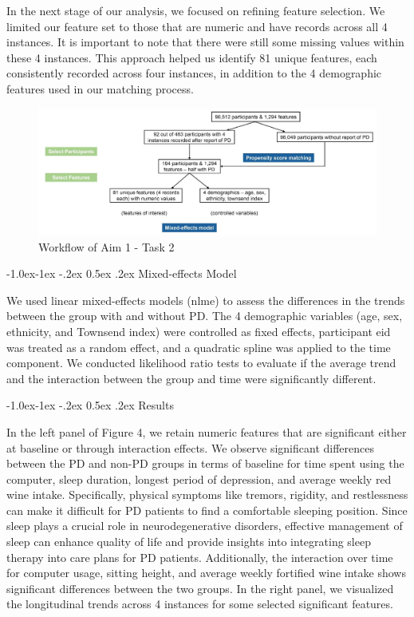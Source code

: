 \documentclass[12pt,]{article}
\makeatletter
\renewcommand\subsubsection{
  \@startsection{subsubsection}{3}{\z@}
    {-1.0ex\@plus -1ex \@minus -.2ex}%
    {0.5ex \@plus .2ex}%
    {\normalfont\normalsize\bf}} %
\makeatother
\begin{document}
In the next stage of our analysis, we focused on refining feature
selection. We limited our feature set to those that are numeric and have
records across all 4 instances. It is important to note that there were
still some missing values within these 4 instances. This approach helped
us identify 81 unique features, each consistently recorded across four
instances, in addition to the 4 demographic features used in our
matching process.

\begin{figure}
\centering
\includegraphics{../figure/Figure 3 - Workflow of Aim 1 - Task 2.png}
\caption{Workflow of Aim 1 - Task 2}
\end{figure}

\hypertarget{mixed-effects-model}{%
\subsubsection{Mixed-effects Model}\label{mixed-effects-model}}

We used linear mixed-effects models (nlme) to assess the differences in
the trends between the group with and without PD. The 4 demographic
variables (age, sex, ethnicity, and Townsend index) were controlled as
fixed effects, participant eid was treated as a random effect, and a
quadratic spline was applied to the time component. We conducted
likelihood ratio tests to evaluate if the average trend and the
interaction between the group and time were significantly different.

\hypertarget{results}{%
\subsubsection{Results}\label{results}}

In the left panel of Figure 4, we retain numeric features that are
significant either at baseline or through interaction effects. We
observe significant differences between the PD and non-PD groups in
terms of baseline for time spent using the computer, sleep duration,
longest period of depression, and average weekly red wine intake.
Specifically, physical symptoms like tremors, rigidity, and restlessness
can make it difficult for PD patients to find a comfortable sleeping
position. Since sleep plays a crucial role in neurodegenerative
disorders, effective management of sleep can enhance quality of life and
provide insights into integrating sleep therapy into care plans for PD
patients. Additionally, the interaction over time for computer usage,
sitting height, and average weekly fortified wine intake shows
significant differences between the two groups. In the right panel, we
visualized the longitudinal trends across 4 instances for some selected
significant features.
\end{document}
